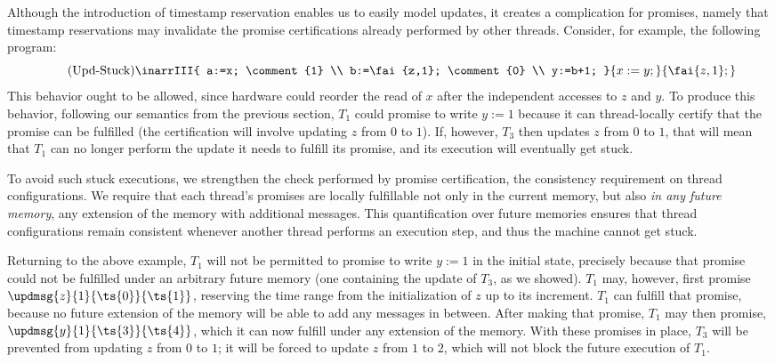 Although the introduction of timestamp reservation enables us to
easily model updates, it creates a complication for promises, namely
that timestamp reservations may invalidate the promise certifications
already performed by other threads.  Consider, for example, the
following program:
\begin{equation}\label{eq:upd-stuck}\tag{Upd-Stuck}
\inarrIII{ a:=x; \comment{1} \\ b:=\fai{z,1}; \comment{0} \\ y:=b+1; }{ x:=y; }{ \fai{z,1};}
\end{equation}
This behavior ought to be allowed, since hardware could reorder the
read of $x$ after the independent accesses to $z$ and $y$.  To produce
this behavior, following our semantics from the previous section,
$T_1$ could promise to write $y:=1$ because it can
thread-locally certify that the promise can be fulfilled (the
certification will involve updating $z$ from $0$ to $1$).  If,
however, $T_3$ then updates $z$ from $0$ to $1$, that will mean that
$T_1$ can no longer perform the update it needs to fulfill its
promise, and its execution will eventually get stuck.

To avoid such stuck executions, we strengthen the check performed by
promise certification, \ie the consistency requirement on thread
configurations.  We require that each thread's promises are locally
fulfillable not only in the current memory, but also \emph{in any
future memory}, \ie any extension of the memory with additional
messages.  This quantification over future memories ensures that
thread configurations remain consistent whenever another thread
performs an execution step, and thus the machine cannot get stuck.

Returning to the above example, $T_1$ will not be permitted to promise
to write $y:=1$ in the initial state, precisely because that promise
could not be fulfilled under an arbitrary future memory (\eg one
containing the update of $T_3$, as we showed).  $T_1$ may, however,
first promise $\updmsg{z}{1}{\ts{0}}{\ts{1}}$, reserving the time
range from the initialization of $z$ up to its increment.  $T_1$
can fulfill that promise, because no future extension of the memory
will be able to add any messages in between.  After making that
promise, $T_1$ may then promise, \eg $\updmsg{y}{1}{\ts{3}}{\ts{4}}$, which it can
now fulfill under any extension of the memory.  With these promises in
place, $T_3$ will be prevented from updating $z$ from $0$ to $1$; it
will be forced to update $z$ from $1$ to $2$, which will not block the
future execution of $T_1$.

